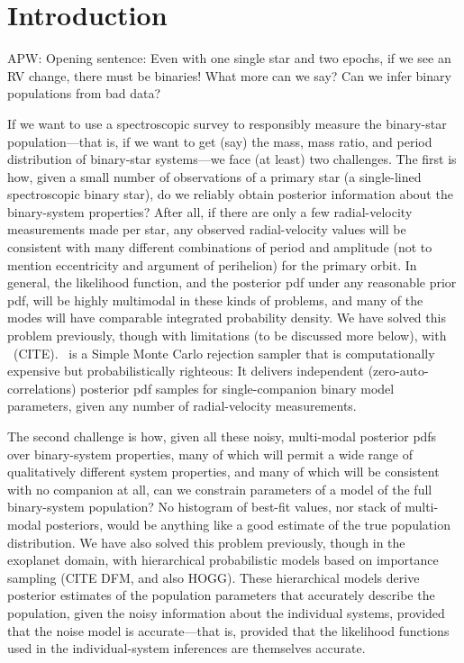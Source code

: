 \documentclass[modern, letterpaper]{aastex61}
\newcommand{\thejoker}{\project{The~Joker}}
\begin{document}

\section{Introduction} \label{sec:intro}

APW: Opening sentence: Even with one single star and two epochs, if we
see an RV change, there must be binaries! What more can we say? Can we
infer binary populations from bad data?

If we want to use a spectroscopic survey to responsibly measure the
binary-star population---that is, if we want to get (say) the mass,
mass ratio, and period distribution of binary-star systems---we face
(at least) two challenges.
The first is how, given a small number of observations of a primary
star (a single-lined spectroscopic binary star), do we reliably obtain posterior
information about the binary-system properties?
After all, if there are only a few radial-velocity measurements made
per star, any observed radial-velocity values will be consistent with
many different combinations of period and amplitude (not to mention
eccentricity and argument of perihelion) for the primary orbit.
In general, the likelihood function, and the posterior pdf under any
reasonable prior pdf, will be highly multimodal in these kinds of
problems, and many of the modes will have comparable integrated
probability density.
We have solved this problem previously, though with limitations (to be
discussed more below), with \thejoker\ (CITE).
\thejoker\ is a Simple Monte Carlo rejection sampler that is
computationally expensive but probabilistically righteous: It delivers
independent (zero-auto-correlations) posterior pdf samples for
single-companion binary model parameters, given any number of
radial-velocity measurements.

The second challenge is how, given all these noisy, multi-modal
posterior pdfs over binary-system properties, many of which will
permit a wide range of qualitatively different system properties, and
many of which will be consistent with no companion at all, can we
constrain parameters of a model of the full binary-system population?
No histogram of best-fit values, nor stack of multi-modal posteriors,
would be anything like a good estimate of the true population
distribution.
We have also solved this problem previously, though in the exoplanet
domain, with hierarchical probabilistic models based on importance
sampling (CITE DFM, and also HOGG).
These hierarchical models derive posterior estimates of the population
parameters that accurately describe the population, given the noisy
information about the individual systems, provided that the noise
model is accurate---that is, provided that the likelihood functions
used in the individual-system inferences are themselves accurate.
\end{document}
